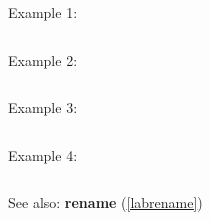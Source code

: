 \noindent Example 1: 
\begin{center}\begin{minipage}{15cm}\begin{Verbatim}[frame=single]
\end{Verbatim}
\end{minipage}\end{center}
\noindent Example 2: 
\begin{center}\begin{minipage}{15cm}\begin{Verbatim}[frame=single]
\end{Verbatim}
\end{minipage}\end{center}
\noindent Example 3: 
\begin{center}\begin{minipage}{15cm}\begin{Verbatim}[frame=single]
\end{Verbatim}
\end{minipage}\end{center}
\noindent Example 4: 
\begin{center}\begin{minipage}{15cm}\begin{Verbatim}[frame=single]
\end{Verbatim}
\end{minipage}\end{center}
See also: \textbf{rename} (\ref{labrename})
